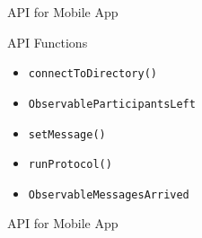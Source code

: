 \begin{frame}{API for Mobile App}
    
    \begin{block}{API Functions}
        \begin{itemize}
            \item \texttt{connectToDirectory()}
            \item \texttt{ObservableParticipantsLeft}
            \item \texttt{setMessage()}
            \item \texttt{runProtocol()}
            \item \texttt{ObservableMessagesArrived}
        \end{itemize}
    \end{block}

\end{frame}

\begin{frame}{API for Mobile App}
\end{frame}